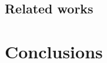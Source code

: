 \documentclass{acm_proc_article-sp}
\begin{document}
\subsection{Related works}

\section{Conclusions}




\balancecolumns
\end{document}
